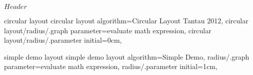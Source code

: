 %
%
%

\ProvidesFileRCS[v\pgfversion] $Header$



%
%
\pgfgddeclarealgorithmkey
  {circular layout}
  {circular layout}
  {
    algorithm=Circular Layout Tantau 2012,
    circular layout/radius/.graph parameter=evaluate math expression,
    circular layout/radius/.parameter initial=0cm,
  }


%
%
\pgfgddeclarealgorithmkey
  {simple demo layout}
  {simple demo layout}
  {
    algorithm=Simple Demo,
    radius/.graph parameter=evaluate math expression,
    radius/.parameter initial=1cm,
  }



\endinput
